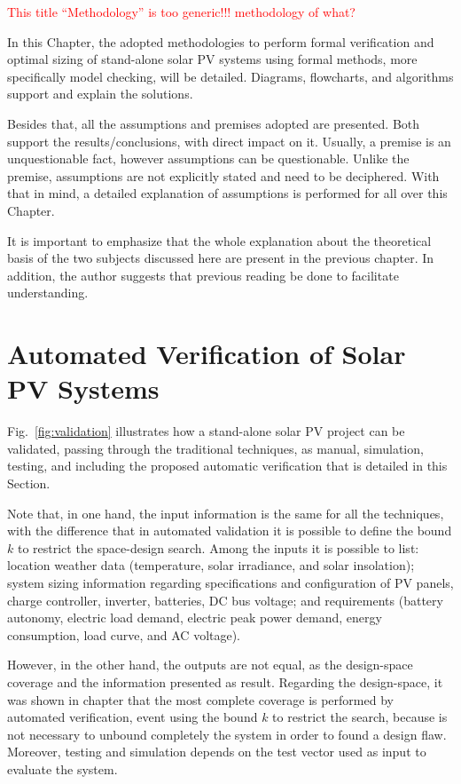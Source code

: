 \textcolor{red}{This title ``Methodology'' is too generic!!! methodology of what?}

%
In this Chapter, the adopted methodologies to perform formal verification and optimal sizing of stand-alone solar PV systems using formal methods, more specifically model checking, will be detailed. Diagrams, flowcharts, and algorithms support and explain the solutions.

Besides that, all the assumptions and premises adopted are presented. Both support the results/conclusions, with direct impact on it. Usually, a premise is an unquestionable fact, however assumptions can be questionable. Unlike the premise, assumptions are not explicitly stated and need to be deciphered. With that in mind, a detailed explanation of assumptions is performed for all over this Chapter.

It is important to emphasize that the whole explanation about the theoretical basis of the two subjects discussed here are present in the previous chapter. In addition, the author suggests that previous reading be done to facilitate understanding.

\section{Automated Verification of Solar PV Systems}

Fig.~\ref{fig:validation} illustrates how a stand-alone solar PV project can be validated, passing through the traditional techniques, as manual, simulation, testing, and including the proposed automatic verification that is detailed in this Section. 

Note that, in one hand, the input information is the same for all the techniques, with the difference that in automated validation it is possible to define the bound $k$ to restrict the space-design search. Among the inputs it is possible to list: location weather data (temperature, solar irradiance, and solar insolation); system sizing information regarding specifications and configuration of PV panels, charge controller, inverter, batteries, DC bus  voltage; and requirements (battery autonomy, electric load demand, electric peak power demand, energy consumption, load curve, and AC voltage).

However, in the other hand, the outputs are not equal, as the design-space coverage and the information presented as result. Regarding the design-space, it was shown in  chapter  that the most complete coverage is performed by automated verification, event using the bound $k$ to restrict the search, because is not necessary to unbound completely the system in order to found a design flaw. Moreover, testing and simulation depends on the test vector used as input to evaluate the system.

